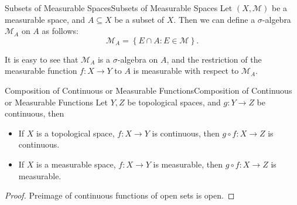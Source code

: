\documentclass[../main.tex]{subfiles}
\begin{document}
\begin{theorem}{Subsets of Measurable Spaces}{Subsets of Measurable Spaces}
	Let $(X, \mathcal{M})$ be a measurable space, and $A\subseteq X$ be a subset of $X$. Then we can define a $\sigma$-algebra $\mathcal{M}_A$ on $A$ as follows:
	\begin{equation*}
		\mathcal{M}_A = \left\{ E \cap A: E\in \mathcal{M} \right\}.
	\end{equation*}
\end{theorem}

It is easy to see that $\mathcal{M}_A$ is a $\sigma$-algebra on $A$, and the restriction of the measurable function $f: X \rightarrow Y$ to $A$ is measurable with respect to $\mathcal{M}_A$.

\begin{theorem}{Composition of Continuous or Measurable Functions}{Composition of Continuous or Measurable Functions}
Let $Y,Z$ be topological spaces, and $g:Y \rightarrow Z$ be continuous, then
\begin{itemize}
\item If $X$ is a topological space, $f:X \rightarrow Y$ is continuous, then $g \circ f: X \rightarrow Z$ is continuous.
\item If $X$ is a measurable space, $f:X \rightarrow Y$ is measurable, then $g \circ f: X \rightarrow Z$ is measurable.
\end{itemize}
\end{theorem}
\begin{proof}
Preimage of continuous functions of open sets is open.
\end{proof}
\end{document}
